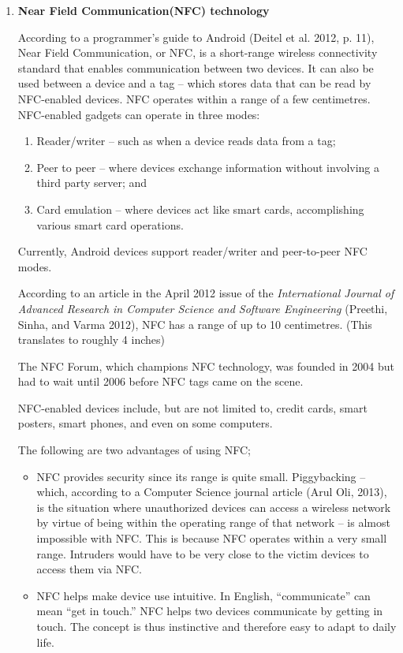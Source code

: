 \documentclass[12pt,svgnames,smaller]{article} %
\begin{document}
\begin{enumerate}
	\item \textbf{ Near Field Communication(NFC) technology }
	
	According to a programmer’s guide to Android (Deitel et al. 2012, p. 11), Near Field Communication, or NFC, is a short-range wireless connectivity standard that enables communication between two devices. It can also be used between a device and a tag – which stores data that can be read by NFC-enabled devices. NFC operates within a range of a few centimetres. NFC-enabled gadgets can operate in three modes:
	

	\begin{enumerate}
		\item Reader/writer – such as when a device reads data from a tag;
		\item Peer to peer – where devices exchange information without involving a third party server; and
		\item Card emulation – where devices act like smart cards, accomplishing various smart card operations.
	\end{enumerate}

	Currently, Android devices support reader/writer and peer-to-peer NFC modes.
	
	According to an article in the April 2012 issue of the \textit{International Journal of Advanced Research in Computer Science and Software Engineering} (Preethi, Sinha, and Varma 2012), NFC has a range of up to 10 centimetres. (This translates to roughly 4 inches)
	
	The NFC Forum, which champions NFC technology, was founded in 2004 but had to wait until 2006 before NFC tags came on the scene.
	
	NFC-enabled devices include, but are not limited to, credit cards, smart posters, smart phones, and even on some computers.
	
	The following are two advantages of using NFC;
	
	\begin{itemize}
		\item NFC provides security since its range is quite small. Piggybacking – which, according to a Computer Science journal article (Arul Oli, 2013), is the situation where unauthorized devices can access a wireless network by virtue of being within the operating range of that network – is almost impossible with NFC. This is because NFC operates within a very small range. Intruders would have to be very close to the victim devices to access them via NFC.
		\item NFC helps make device use intuitive. In English, “communicate” can mean “get in touch.” NFC helps two devices communicate by getting in touch. The concept is thus instinctive and therefore easy to adapt to daily life.
	\end{itemize}
	

\end{enumerate}
\end{document}
